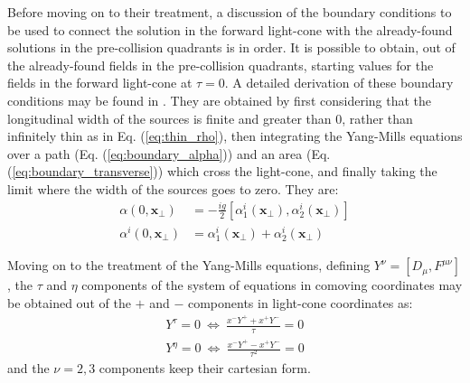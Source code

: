 Before moving on to their treatment, a discussion of the boundary conditions to be used to connect the solution in the forward light-cone with the already-found solutions in the pre-collision quadrants is in order. It is possible to obtain, out of the already-found fields in the pre-collision quadrants, starting values for the fields in the forward light-cone at $\tau = 0$. A detailed derivation of these boundary conditions may be found in \cite[Appendix C]{Carrington:2022bnv}. They are obtained by first considering that the longitudinal width of the sources is finite and greater than 0, rather than infinitely thin as in Eq. (\ref{eq:thin_rho}), then integrating the Yang-Mills equations over a path (Eq. (\ref{eq:boundary_alpha})) and an area (Eq. (\ref{eq:boundary_transverse})) which cross the light-cone, and finally taking the limit where the width of the sources goes to zero. They are:
\begin{subequations}
	\label{eq:boundary_conditions}
	\begin{align}
		\alpha(0, \mathbf{x}_\perp) & = -\frac{ig}{2} \left[ \alpha_1^i(\mathbf{x}_\perp), \alpha_2^i(\mathbf{x}_\perp) \right]
		\label{eq:boundary_alpha} \\
		\alpha^i(0, \mathbf{x}_\perp) & =  \alpha_1^i(\mathbf{x}_\perp) + \alpha_2^i(\mathbf{x}_\perp)
		\label{eq:boundary_transverse}
	\end{align}
\end{subequations}

Moving on to the treatment of the Yang-Mills equations, defining $Y^\nu = [D_\mu, F^{\mu\nu}]$, the $\tau$ and $\eta$ components of the system of equations in comoving coordinates may be obtained out of the $+$ and $-$ components in light-cone coordinates as:
\begin{subequations}
	\begin{gather}
		Y^\tau = 0 ~ \Leftrightarrow ~ \frac{x^- Y^+ + x^+ Y^-}{\tau} = 0 \\
		Y^\eta = 0 ~ \Leftrightarrow ~ \frac{x^- Y^+ - x^+ Y^-}{\tau^2} = 0
	\end{gather}
\end{subequations}
and the $\nu = 2,3$ components keep their cartesian form.

